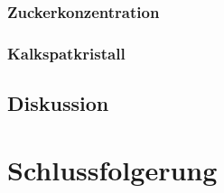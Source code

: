 \documentclass[
	a4paper,
	12pt,
	pagesize,
	ngerman
]{scrartcl}
\begin{document}
	\subsubsection{Zuckerkonzentration}
	\subsubsection{Kalkspatkristall}
	
	\subsection{Diskussion}
	

	\section{Schlussfolgerung}
	
\end{document}

